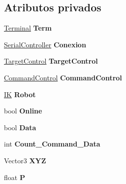 \subsection*{Atributos privados}
\begin{DoxyCompactItemize}
\item 
\mbox{\label{class_controller_aceff4b20397af9f5d93540b9cd7b450a}} 
\mbox{\hyperlink{class_command_terminal_1_1_terminal}{Terminal}} {\bfseries Term}
\item 
\mbox{\label{class_controller_a2d11d60bd4def767d7b4c97a743a1d2f}} 
\mbox{\hyperlink{class_serial_controller}{Serial\+Controller}} {\bfseries Conexion}
\item 
\mbox{\label{class_controller_a0b9acebc208179483dd1853b3f285bf2}} 
\mbox{\hyperlink{class_target_control}{Target\+Control}} {\bfseries Target\+Control}
\item 
\mbox{\label{class_controller_a7cdb5c0c1303ce30d522aab86ea7647b}} 
\mbox{\hyperlink{class_command_control}{Command\+Control}} {\bfseries Command\+Control}
\item 
\mbox{\label{class_controller_ab0c8e0ad9d428ee4d2e5e319ab89a578}} 
\mbox{\hyperlink{class_i_k}{IK}} {\bfseries Robot}
\item 
\mbox{\label{class_controller_a8cc37c5a29d6e540741ef7142c994450}} 
bool {\bfseries Online}
\item 
\mbox{\label{class_controller_a3fb0a56f70db96f6dcfae1973789ada0}} 
bool {\bfseries Data}
\item 
\mbox{\label{class_controller_a7ef0e63a28bad654d55587785c86de81}} 
int {\bfseries Count\+\_\+\+Command\+\_\+\+Data}
\item 
\mbox{\label{class_controller_a0fdca594ef5cce610cf696b930e1fb91}} 
Vector3 {\bfseries X\+YZ}
\item 
\mbox{\label{class_controller_a9e04412e2e8ebae98859e5aed8b109f6}} 
float {\bfseries P}
\item 

\end{DoxyCompactItemize}
